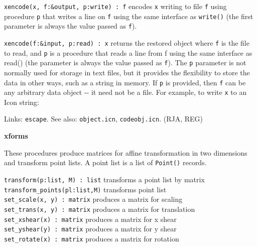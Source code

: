 \texttt{xencode(x, f:\&output, p:write) : f} encodes \texttt{x} writing
to file \texttt{f} using procedure \texttt{p} that writes a line on
\texttt{f} using the same interface as \texttt{write()} (the first
parameter is always the value passed as \texttt{f}).

\texttt{xencode(f:\&input, p:read) : x} returns the restored object
where \texttt{f} is the file to read, and \texttt{p} is a procedure
that reads a line from f using the same interface as read() (the
parameter is always the value passed as \texttt{f}). The \texttt{p}
parameter is not normally used for storage in text files, but it
provides the flexibility to store the data in other ways, such as a
string in memory. If \texttt{p} is provided, then \texttt{f} can be any
arbitrary data object -{}- it need not be a file. For example, to
{\textquotedbl}write{\textquotedbl} \texttt{x} to an Icon string:


Links: \texttt{escape}. See also: \texttt{object.icn},
\texttt{codeobj.icn}. (RJA, REG)

{\sffamily\bfseries
xforms}

These procedures produce matrices for affine transformation in two
dimensions and transform point lists. A point list is a list of
\texttt{Point()} records.

\texttt{transform(p:list, M) : list} transforms a point list by
matrix\\
\texttt{transform\_points(pl:list,M)} transforms point list\\
\texttt{set\_scale(x, y) : matrix} produces a matrix for scaling\\
\texttt{set\_trans(x, y) : matrix} produces a matrix for
translation\\
\texttt{set\_xshear(x) : matrix} produces a matrix for x shear\\
\texttt{set\_yshear(y) : matrix} produces a matrix for y shear\\
\texttt{set\_rotate(x) : matrix} produces a matrix for rotation

